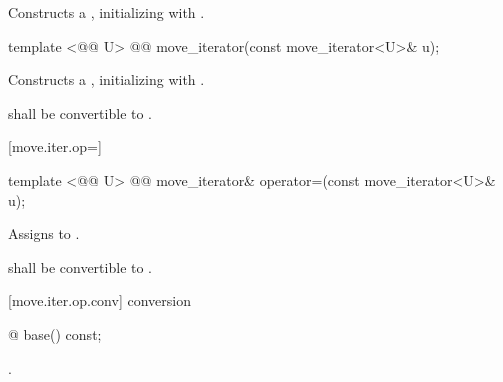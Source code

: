 \begin{itemdescr}
\pnum
\effects Constructs a , initializing
 with .
\end{itemdescr}


%
\begin{itemdecl}
template <@@ U>
  @@
move_iterator(const move_iterator<U>& u);
\end{itemdecl}

\begin{itemdescr}
\pnum
\effects Constructs a , initializing
 with .

\begin{removedblock}
\pnum
\requires {} shall be convertible to
.
\end{removedblock}
\end{itemdescr}

[move.iter.op=]{}

%
%
\begin{itemdecl}
template <@@ U>
  @@
move_iterator& operator=(const move_iterator<U>& u);
\end{itemdecl}

\begin{itemdescr}
\pnum
\effects Assigns  to
.

\begin{removedblock}
\pnum
\requires {} shall be convertible to
.
\end{removedblock}
\end{itemdescr}

[move.iter.op.conv]{ conversion}

%
%
\begin{itemdecl}
@ base() const;
\end{itemdecl}

\begin{itemdescr}
\pnum
\returns {}.
\end{itemdescr}

